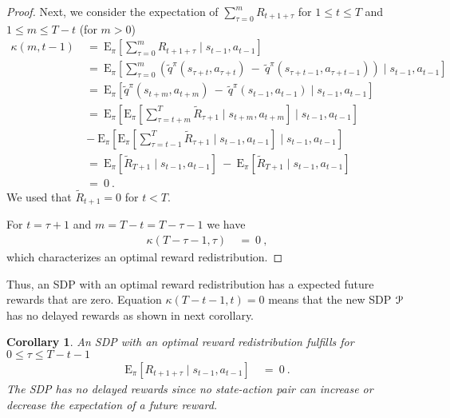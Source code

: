 \documentclass{article}
\newtheorem{corollaryA}{Corollary}\newtheorem{propositionA}{Proposition}\newtheorem{lemmaA}{Lemma}\newtheorem{conjectureA}{Conjecture}
\newcommand\EXP{\mathbf{\mathrm{E}}}
\renewcommand{\leq}{\leqslant}
\begin{document}
\begin{appendices}
\begin{proof}
Next, we consider the expectation of $\sum_{\tau=0}^{m} R_{t+1+\tau}$
for $1 \leq t\leq T$ and $1\leq m\leq T-t$ (for $m>0$)
\begin{align}
  \kappa(m,t-1) \ &= \ 
  \EXP_{\pi} \left[ \sum_{\tau=0}^{m} R_{t+1+\tau}  
  \mid s_{t-1},a_{t-1}\right]\\ \nonumber
  &= \
  \EXP_{\pi} \left[\sum_{\tau=0}^{m}
  \left(\tilde{q}^\pi(s_{\tau+t},a_{\tau+t}) \ - \
    \tilde{q}^\pi(s_{\tau+t-1},a_{\tau+t-1}) \right)  \mid
  s_{t-1},a_{t-1}\right] \\ \nonumber
  &= \
  \EXP_{\pi} \left[\tilde{q}^\pi(s_{t+m},a_{t+m})  \ - \
    \tilde{q}^\pi(s_{t-1},a_{t-1})
    \mid s_{t-1},a_{t-1}\right]\\ \nonumber
   &= \ \EXP_{\pi}\left[\EXP_{\pi}\left[ \sum_{\tau=t+m}^{T}
       \tilde{R}_{\tau+1} \mid s_{t+m},a_{t+m} \right]  \mid 
  s_{t-1},a_{t-1}\right]  \\ \nonumber
  &- \
   \EXP_{\pi}\left[\EXP_{\pi}\left[ \sum_{\tau=t-1}^{T}
       \tilde{R}_{\tau+1}  \mid s_{t-1},a_{t-1}\right] \mid
       s_{t-1},a_{t-1}\right] \\ \nonumber
 &= \ \EXP_{\pi}\left[ \tilde{R}_{T+1} \mid 
  s_{t-1},a_{t-1}\right]   \ - \
   \EXP_{\pi}\left[ \tilde{R}_{T+1}  \mid s_{t-1},a_{t-1}\right] \\ \nonumber
  &= \ 0 \ .
\end{align}
We used that $\tilde{R}_{t+1}=0$ for $t <T$.

For $t=\tau+1$ and $m=T-t=T-\tau-1$ we have
\begin{align}
  \kappa(T-\tau-1,\tau) \ &= \ 0 \ ,
\end{align}
which characterizes an optimal reward redistribution.

\end{proof}
Thus, an SDP with an optimal reward redistribution 
has a expected future rewards that are zero.
Equation $\kappa(T-t-1,t)= 0$ means that the new SDP $\mathcal{P}$
has no delayed rewards as shown in next corollary.
\begin{corollaryA}
\label{th:ApropDelay}
An SDP with an optimal reward redistribution
fulfills for $0\leq \tau \leq T-t-1$ 
\begin{align}
  \EXP_{\pi} \left[ R_{t+1+\tau}  \mid
  s_{t-1}, a_{t-1} \right] \ &= \ 0 \ .
\end{align}
The SDP has no delayed rewards since no state-action pair
can increase or decrease the expectation of a future reward.
\end{corollaryA}


\end{appendices}
\end{document}
